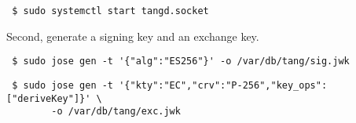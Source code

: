 \documentclass[../xdudla00-porting-Tang-to-Open-WRT.tex]{subfiles}
\begin{document}
{\tt\begin{verbatim} $ sudo systemctl start tangd.socket\end{verbatim}
}

Second, generate a signing key and an exchange key.

{\tt\begin{verbatim} $ sudo jose gen -t '{"alg":"ES256"}' -o /var/db/tang/sig.jwk\end{verbatim}
}

{\tt\begin{verbatim} $ sudo jose gen -t '{"kty":"EC","crv":"P-256","key_ops":["deriveKey"]}' \
        -o /var/db/tang/exc.jwk\end{verbatim}
}
\end{document}
